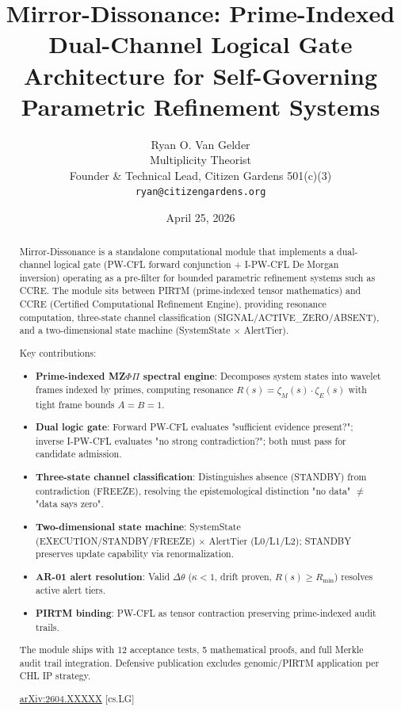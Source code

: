 \documentclass[11pt]{article}
\title{\textbf{Mirror-Dissonance: Prime-Indexed Dual-Channel Logical Gate Architecture for Self-Governing Parametric Refinement Systems}}
\author{Ryan O. Van Gelder \\
Multiplicity Theorist \\
Founder \& Technical Lead, Citizen Gardens 501(c)(3) \\
\texttt{ryan@citizengardens.org}}
\date{April 25, 2026}
\begin{document}
\maketitle

\begin{abstract}
Mirror-Dissonance is a standalone computational module that implements a dual-channel logical gate (PW-CFL forward conjunction + I-PW-CFL De Morgan inversion) operating as a pre-filter for bounded parametric refinement systems such as CCRE. The module sits between PIRTM (prime-indexed tensor mathematics) and CCRE (Certified Computational Refinement Engine), providing resonance computation, three-state channel classification (SIGNAL/ACTIVE\_ZERO/ABSENT), and a two-dimensional state machine (SystemState $\times$ AlertTier).

Key contributions:
\begin{itemize}
\item \textbf{Prime-indexed MZ$\Phi\Pi$ spectral engine}: Decomposes system states into wavelet frames indexed by primes, computing resonance $R(s) = \zeta_M(s) \cdot \zeta_E(s)$ with tight frame bounds $A=B=1$.
\item \textbf{Dual logic gate}: Forward PW-CFL evaluates "sufficient evidence present?"; inverse I-PW-CFL evaluates "no strong contradiction?"; both must pass for candidate admission.
\item \textbf{Three-state channel classification}: Distinguishes absence (STANDBY) from contradiction (FREEZE), resolving the epistemological distinction "no data" $\neq$ "data says zero".
\item \textbf{Two-dimensional state machine}: SystemState (EXECUTION/STANDBY/FREEZE) $\times$ AlertTier (L0/L1/L2); STANDBY preserves update capability via renormalization.
\item \textbf{AR-01 alert resolution}: Valid $\Delta\theta$ ($\kappa < 1$, drift proven, $R(s) \ge R_{\min}$) resolves active alert tiers.
\item \textbf{PIRTM binding}: PW-CFL as tensor contraction preserving prime-indexed audit trails.
\end{itemize}

The module ships with 12 acceptance tests, 5 mathematical proofs, and full Merkle audit trail integration. Defensive publication excludes genomic/PIRTM application per CHL IP strategy.

\href{https://arxiv.org/abs/2604.XXXXX}{arXiv:2604.XXXXX} [cs.LG]
\end{abstract}
\end{document}
